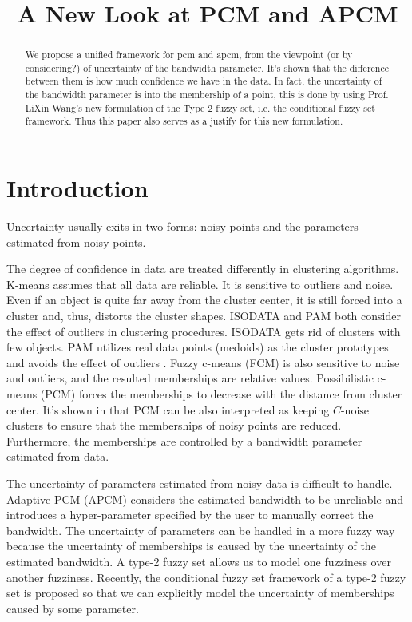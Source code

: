 \documentclass[journal]{IEEEtran}
\date{}
\title{A New Look at PCM and APCM}
\theoremstyle{definition}
\begin{document}
\maketitle
\begin{abstract}
We propose a unified framework for pcm and apcm, from the viewpoint (or by considering?) of uncertainty of the bandwidth parameter. It's shown that the difference between them is how much confidence we have in the data. In fact, the uncertainty of the bandwidth parameter is into the membership of  a point, this is done by using Prof. LiXin Wang's new formulation of the Type 2 fuzzy set, i.e. the conditional fuzzy set framework. Thus this paper also serves as a justify for this new formulation.
\end{abstract}

\section{Introduction}
\label{sec-1}

Uncertainty usually exits in two forms: noisy points and the parameters estimated from noisy points.

The degree of confidence in data are treated differently in clustering algorithms.
K-means \cite{jain_data_2010} assumes that all data are reliable. It is sensitive to outliers and noise. Even if an object is quite far away from the cluster center, it is still forced into a cluster and, thus, distorts the cluster shapes. ISODATA \cite{ball_clustering_1967} and PAM \cite{kaufman_finding_2009} both consider the effect of outliers in clustering procedures. ISODATA gets rid of clusters with few objects. PAM utilizes real data points (medoids) as the cluster prototypes and avoids the effect of outliers \cite{xu_survey_2005}.
Fuzzy c-means (FCM) \cite{bezdek_pattern_2013} is also sensitive to noise and outliers, and the resulted memberships are relative values.  Possibilistic c-means (PCM) \cite{krishnapuram_possibilistic_1993} forces the memberships to decrease with the distance from cluster center. It's shown in \cite{dave_robust_1997} that PCM can be also interpreted as keeping $C\text{-noise}$ clusters to ensure that the memberships of noisy points are reduced. Furthermore, the memberships are controlled by a bandwidth parameter estimated from data.

The uncertainty of parameters estimated from noisy data is difficult to handle.
Adaptive PCM (APCM) \cite{xenaki_novel_2016} considers the estimated bandwidth to be unreliable and introduces a hyper-parameter specified by the user to manually correct the bandwidth. The uncertainty of parameters can be handled in a more fuzzy way because the uncertainty of memberships is caused by the uncertainty of the estimated bandwidth. 
A type-2 fuzzy set \cite{zadeh_concept_1975}\cite{mendel_type-2_2002} allows us to model one fuzziness over another fuzziness. Recently, the conditional fuzzy set framework of a type-2 fuzzy set is proposed so that we can explicitly model the uncertainty of memberships caused by some parameter.
\end{document}
